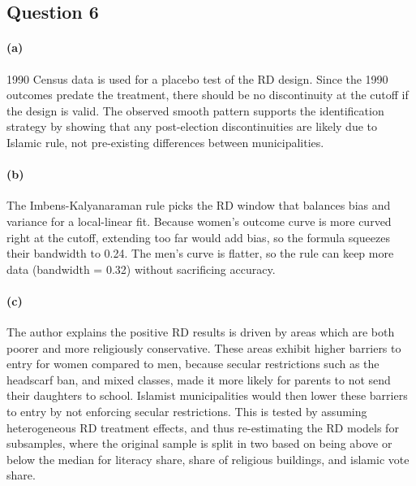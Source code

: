 \documentclass{scrartcl}
\begin{document}
\subsection*{Question 6}

\paragraph*{(a)}

 1990 Census data is used for a placebo test of the RD design. Since the 1990 outcomes predate the treatment, there should be no discontinuity at the cutoff if the design is valid. The observed smooth pattern supports the identification strategy by showing that any post-election discontinuities are likely due to Islamic rule, not pre-existing differences between municipalities.




\paragraph*{(b)}

The Imbens-Kalyanaraman rule picks the RD window that balances bias and variance for a local-linear fit. Because women’s outcome curve is more curved right at the cutoff, extending too far would add bias, so the formula squeezes their bandwidth to 0.24. The men’s curve is flatter, so the rule can keep more data (bandwidth = 0.32) without sacrificing accuracy.

\paragraph*{(c)}

The author explains the positive RD results is driven by areas which are both poorer and more religiously conservative. These areas exhibit higher barriers to entry for women compared to men, because secular restrictions such as the headscarf ban, and mixed classes, made it more likely for parents to not send their daughters to school. Islamist municipalities would then lower these barriers to entry by not enforcing secular restrictions. This is tested by assuming heterogeneous RD treatment effects, and thus re-estimating the RD models for subsamples, where the original sample is split in two based on being above or below the median for literacy share, share of religious buildings, and islamic vote share.
\end{document}
